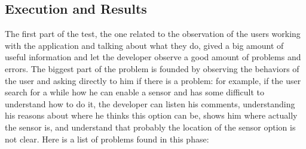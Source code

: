 \subsection{Execution and Results}
The first part of the test, the one related to the observation of the users working with the application and talking about what they do, gived a big amount of useful information and let the developer observe a good amount of problems and errors. 
The biggest part of the problem is founded by observing the behaviors of the user and asking directly to him if there is a problem: for example, if the user search for a while how he can enable a sensor and has some difficult to understand how to do it, the developer can listen his comments, understanding his reasons about where he thinks this option can be, shows him where actually the sensor is, and understand that probably the location of the sensor option is not clear. 
Here is a list of problems found in this phase:

